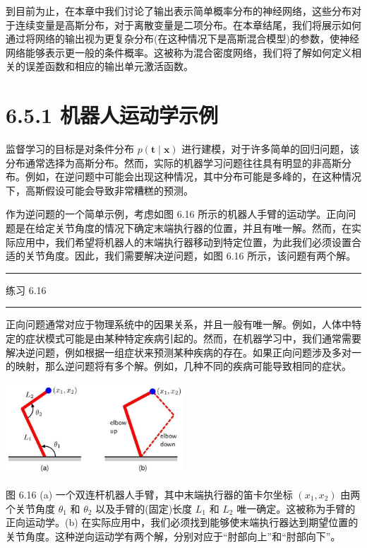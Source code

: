 \documentclass[10pt]{report}
\newcommand{\HRule}{\begin{center}\rule{0.9\linewidth}{0.2mm}\end{center}}
\begin{document}
到目前为止，在本章中我们讨论了输出表示简单概率分布的神经网络，这些分布对于连续变量是高斯分布，对于离散变量是二项分布。在本章结尾，我们将展示如何通过将网络的输出视为更复杂分布(在这种情况下是高斯混合模型)的参数，使神经网络能够表示更一般的条件概率。这被称为混合密度网络，我们将了解如何定义相关的误差函数和相应的输出单元激活函数。

\section*{6.5.1 机器人运动学示例}

监督学习的目标是对条件分布 \(p\left( {\mathbf{t} \mid  \mathbf{x}}\right)\) 进行建模，对于许多简单的回归问题，该分布通常选择为高斯分布。然而，实际的机器学习问题往往具有明显的非高斯分布。例如，在逆问题中可能会出现这种情况，其中分布可能是多峰的，在这种情况下，高斯假设可能会导致非常糟糕的预测。

作为逆问题的一个简单示例，考虑如图 6.16 所示的机器人手臂的运动学。正向问题是在给定关节角度的情况下确定末端执行器的位置，并且有唯一解。然而，在实际应用中，我们希望将机器人的末端执行器移动到特定位置，为此我们必须设置合适的关节角度。因此，我们需要解决逆问题，如图 6.16 所示，该问题有两个解。

\HRule

练习 6.16

\HRule

正向问题通常对应于物理系统中的因果关系，并且一般有唯一解。例如，人体中特定的症状模式可能是由某种特定疾病引起的。然而，在机器学习中，我们通常需要解决逆问题，例如根据一组症状来预测某种疾病的存在。如果正向问题涉及多对一的映射，那么逆问题将有多个解。例如，几种不同的疾病可能导致相同的症状。

\begin{center}
\includegraphics[max width=0.5\textwidth]{images/0194e279-9b28-703a-88f4-c3ac21e2010d_218_698_343_718_369_0.jpg}
\end{center}
\hspace*{3em} 

图 6.16 (a) 一个双连杆机器人手臂，其中末端执行器的笛卡尔坐标 \(\left( {{x}_{1},{x}_{2}}\right)\) 由两个关节角度 \({\theta }_{1}\) 和 \({\theta }_{2}\) 以及手臂的(固定)长度 \({L}_{1}\) 和 \({L}_{2}\) 唯一确定。这被称为手臂的正向运动学。(b) 在实际应用中，我们必须找到能够使末端执行器达到期望位置的关节角度。这种逆向运动学有两个解，分别对应于“肘部向上”和“肘部向下”。
\end{document}
